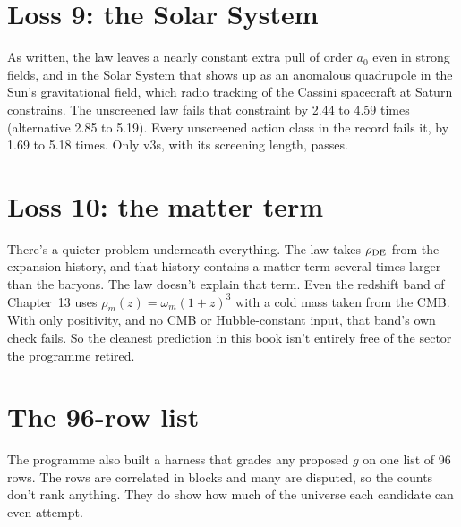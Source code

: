 \section{Loss 9: the Solar System}

As written, the law leaves a nearly constant extra pull of order $a_0$ even in strong fields, and in the Solar System that shows up as an anomalous quadrupole in the Sun's gravitational field, which radio tracking of the Cassini spacecraft at Saturn constrains. The unscreened law fails that constraint by 2.44 to 4.59 times (alternative 2.85 to 5.19). Every unscreened action class in the record fails it, by 1.69 to 5.18 times. Only v3s, with its screening length, passes.


\section{Loss 10: the matter term}

There's a quieter problem underneath everything. The law takes $\rho_{\rm DE}$ from the expansion history, and that history contains a matter term several times larger than the baryons. The law doesn't explain that term. Even the redshift band of Chapter~13 uses $\rho_m(z)=\omega_m(1+z)^3$ with a cold mass taken from the CMB. With only positivity, and no CMB or Hubble-constant input, that band's own check fails. So the cleanest prediction in this book isn't entirely free of the sector the programme retired.

\section{The 96-row list}

The programme also built a harness that grades any proposed $g$ on one list of 96 rows. The rows are correlated in blocks and many are disputed, so the counts don't rank anything. They do show how much of the universe each candidate can even attempt.


